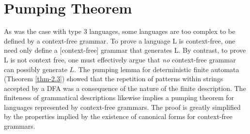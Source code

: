\section{Pumping Theorem}\label{sec-9.4}

As was the case with type 3 languages, some languages are too complex to be
defined by a context-free grammar. To prove a language L is context-free, one
need only define a [context-free] grammar that generates L. By contrast, to prove L is not
context free, one must effectively argue that \emph{no} context-free grammar can
possibly generate $L$. The pumping lemma for deterministic finite automata
(Theorem \ref{thm-2.3}) showed that the repetition of patterns within strings accepted by
a DFA was a consequence of the nature of the finite description. The finiteness
of grammatical descriptions likewise implies a pumping theorem for languages
represented by context-free grammars. The proof is greatly simplified by the
properties implied by the existence of canonical forms for context-free
grammars.

